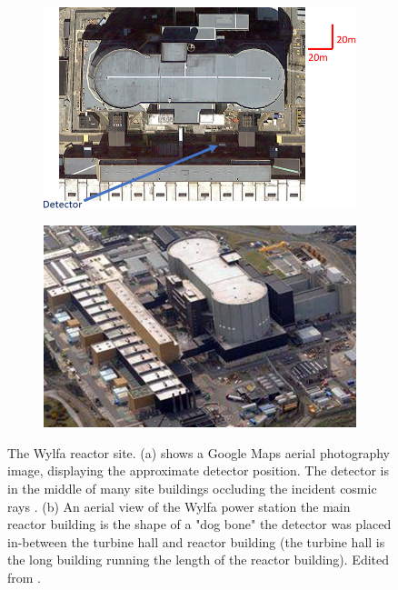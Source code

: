 \begin{figure}[!h]
\centering
\begin{subfigure}{.5\textwidth}
  \centering
  \includegraphics[width=\linewidth]{Chapter5/Figs/wylfaRasterNew/DetectorPositionTopDown.png}
  \captionsetup{width=.9\linewidth}
  \caption{}
  \label{subFig:DetectorPositionTopDown}
\end{subfigure}%
\begin{subfigure}{.5\textwidth}
  \centering
\includegraphics[width=\linewidth]{Chapter5/Figs/Raster/wylfaArielView.png}
  \captionsetup{width=.9\linewidth}
  \caption{}
  \label{subFig:wylfaArielView}
\end{subfigure}
\caption{The Wylfa reactor site. (a) shows a Google Maps aerial photography image, displaying the approximate detector position. The detector is in the middle of many site buildings occluding the incident cosmic rays \cite{GoogleMapsWylfaLink}. (b) An aerial view of the Wylfa power station the main reactor building is the shape of a "dog bone" the detector was placed in-between the turbine hall and reactor building (the turbine hall is the long building running the length of the reactor building). Edited from \cite{wylfaDronePictureLink}.}
\label{fig:DetectorPosition_TopDownAndAriel}
\end{figure}


